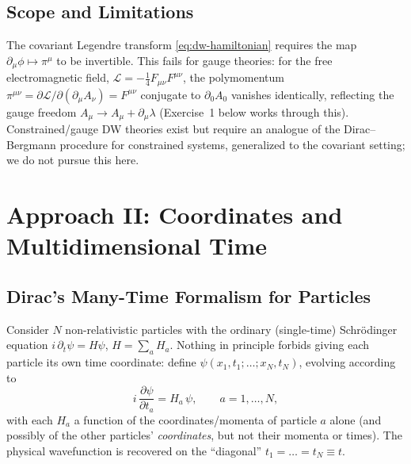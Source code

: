 \documentclass[11pt]{book}
\newcommand{\pdv}[2]{\dfrac{\partial #1}{\partial #2}}
\newcommand{\Lag}{\mathcal{L}}
\theoremstyle{definition}
\theoremstyle{remark}
\begin{document}
\subsection{Scope and Limitations}
\label{sec:scope}

The covariant Legendre transform \eqref{eq:dw-hamiltonian} requires the map $\partial_\mu\phi \mapsto \pi^\mu$ to be invertible. This fails for gauge theories: for the free electromagnetic field, $\Lag=-\tfrac14F_{\mu\nu}F^{\mu\nu}$, the polymomentum $\pi^{\mu\nu}=\partial\Lag/\partial(\partial_\mu A_\nu)=F^{\mu\nu}$ conjugate to $\partial_0A_0$ vanishes identically, reflecting the gauge freedom $A_\mu\to A_\mu+\partial_\mu\lambda$ (Exercise~1 below works through this). Constrained/gauge DW theories exist but require an analogue of the Dirac--Bergmann procedure for constrained systems, generalized to the covariant setting; we do not pursue this here.

\section{Approach II: Coordinates and Multidimensional Time}
\label{sec:approach2}

\subsection{Dirac's Many-Time Formalism for Particles}
\label{sec:dirac-multitime}

Consider $N$ non-relativistic particles with the ordinary (single-time) Schr\"odinger equation $i\,\partial_t\psi = H\psi$, $H=\sum_a H_a$. Nothing in principle forbids giving each particle its own time coordinate: define $\psi(x_1,t_1;\dots;x_N,t_N)$, evolving according to
\begin{equation}
i\,\pdv{\psi}{t_a} = H_a\,\psi , \qquad a=1,\dots,N,
\label{eq:multitime-schrodinger}
\end{equation}
with each $H_a$ a function of the coordinates/momenta of particle $a$ alone (and possibly of the other particles' \emph{coordinates}, but not their momenta or times). The physical wavefunction is recovered on the ``diagonal'' $t_1=\dots=t_N\equiv t$.
\end{document}
